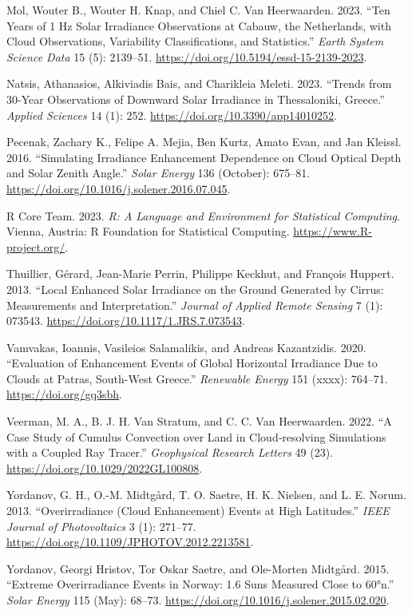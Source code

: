\documentclass[
  preprint, 3p, authoryear]{article}
\newlength{\cslhangindent}
\newlength{\cslentryspacingunit} %
\newenvironment{CSLReferences}[2] %
 {%
  \setlength{\parindent}{0pt}
  \ifodd #1
  \let\oldpar\par
  \def\par{\hangindent=\cslhangindent\oldpar}
  \fi
  \setlength{\parskip}{#2\cslentryspacingunit}
 }%
 {}
\begin{document}
\begin{CSLReferences}{1}{0}
\leavevmode{}%
Mol, Wouter B., Wouter H. Knap, and Chiel C. Van Heerwaarden. 2023. {``Ten Years of 1 Hz Solar Irradiance Observations at Cabauw, the Netherlands, with Cloud Observations, Variability Classifications, and Statistics.''} \emph{Earth System Science Data} 15 (5): 2139--51. \url{https://doi.org/10.5194/essd-15-2139-2023}.

\leavevmode{}%
Natsis, Athanasios, Alkiviadis Bais, and Charikleia Meleti. 2023. {``Trends from 30-Year Observations of Downward Solar Irradiance in Thessaloniki, Greece.''} \emph{Applied Sciences} 14 (1): 252. \url{https://doi.org/10.3390/app14010252}.

\leavevmode{}%
Pecenak, Zachary K., Felipe A. Mejia, Ben Kurtz, Amato Evan, and Jan Kleissl. 2016. {``Simulating Irradiance Enhancement Dependence on Cloud Optical Depth and Solar Zenith Angle.''} \emph{Solar Energy} 136 (October): 675--81. \url{https://doi.org/10.1016/j.solener.2016.07.045}.

\leavevmode{}%
R Core Team. 2023. \emph{R: A Language and Environment for Statistical Computing}. Vienna, Austria: R Foundation for Statistical Computing. \url{https://www.R-project.org/}.

\leavevmode{}%
Thuillier, Gérard, Jean-Marie Perrin, Philippe Keckhut, and François Huppert. 2013. {``Local Enhanced Solar Irradiance on the Ground Generated by Cirrus: Measurements and Interpretation.''} \emph{Journal of Applied Remote Sensing} 7 (1): 073543. \url{https://doi.org/10.1117/1.JRS.7.073543}.

\leavevmode{}%
Vamvakas, Ioannis, Vasileios Salamalikis, and Andreas Kazantzidis. 2020. {``Evaluation of Enhancement Events of Global Horizontal Irradiance Due to Clouds at Patras, South-West Greece.''} \emph{Renewable Energy} 151 (xxxx): 764--71. \url{https://doi.org/gq3sbh}.

\leavevmode{}%
Veerman, M. A., B. J. H. Van Stratum, and C. C. Van Heerwaarden. 2022. {``A Case Study of Cumulus Convection over Land in Cloud‐resolving Simulations with a Coupled Ray Tracer.''} \emph{Geophysical Research Letters} 49 (23). \url{https://doi.org/10.1029/2022GL100808}.

\leavevmode{}%
Yordanov, G. H., O.-M. Midtgård, T. O. Saetre, H. K. Nielsen, and L. E. Norum. 2013. {``Overirradiance (Cloud Enhancement) Events at High Latitudes.''} \emph{{IEEE} Journal of Photovoltaics} 3 (1): 271--77. \url{https://doi.org/10.1109/JPHOTOV.2012.2213581}.

\leavevmode{}%
Yordanov, Georgi Hristov, Tor Oskar Saetre, and Ole-Morten Midtgård. 2015. {``Extreme Overirradiance Events in Norway: 1.6 Suns Measured Close to 60°n.''} \emph{Solar Energy} 115 (May): 68--73. \url{https://doi.org/10.1016/j.solener.2015.02.020}.

\end{CSLReferences}
\end{document}
